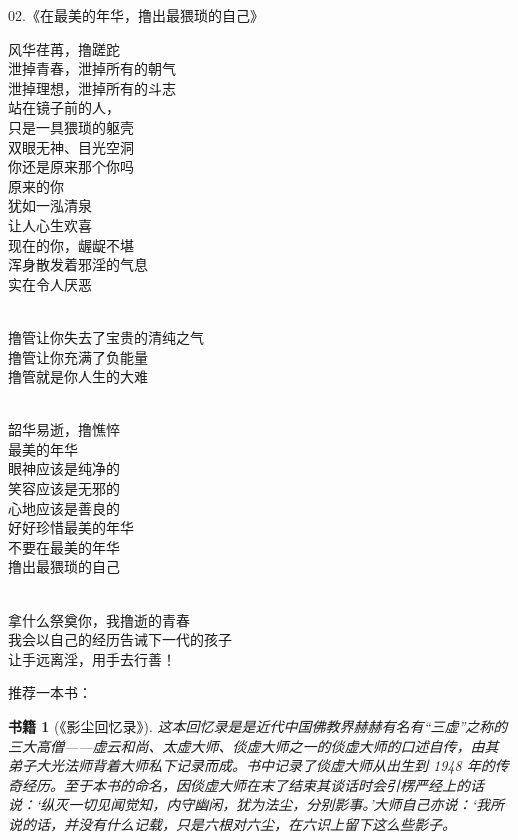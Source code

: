 \documentclass{ctexart}
\newtheorem{book}{书籍}
\begin{document}
\begin{center}
    02.《在最美的年华，撸出最猥琐的自己》\it
    \begin{multicols}{2}
        风华荏苒，撸蹉跎 \\ 泄掉青春，泄掉所有的朝气 \\ 泄掉理想，泄掉所有的斗志 \\ 站在镜子前的人， \\ 只是一具猥琐的躯壳 \\ 双眼无神、目光空洞 \\ 你还是原来那个你吗 \\ 原来的你 \\ 犹如一泓清泉 \\ 让人心生欢喜 \\ 现在的你，龌龊不堪 \\ 浑身散发着邪淫的气息 \\ 实在令人厌恶

        ~\\

        撸管让你失去了宝贵的清纯之气 \\ 撸管让你充满了负能量 \\ 撸管就是你人生的大难

        ~\\

        韶华易逝，撸憔悴 \\ 最美的年华 \\ 眼神应该是纯净的 \\ 笑容应该是无邪的 \\ 心地应该是善良的 \\ 好好珍惜最美的年华 \\ 不要在最美的年华 \\ 撸出最猥琐的自己

        ~\\

        拿什么祭奠你，我撸逝的青春 \\ 我会以自己的经历告诫下一代的孩子 \\ 让手远离淫，用手去行善！
    \end{multicols}
\end{center}

推荐一本书：

\begin{book}[《影尘回忆录》]
    这本回忆录是是近代中国佛教界赫赫有名有“三虚”之称的三大高僧——虚云和尚、太虚大师、倓虚大师之一的倓虚大师的口述自传，由其弟子大光法师背着大师私下记录而成。书中记录了倓虚大师从出生到 1948 年的传奇经历。至于本书的命名，因倓虚大师在末了结束其谈话时会引楞严经上的话说：‘纵灭一切见闻觉知，内守幽闲，犹为法尘，分别影事。’大师自己亦说：‘我所说的话，并没有什么记载，只是六根对六尘，在六识上留下这么些影子。
\end{book}
\end{document}
